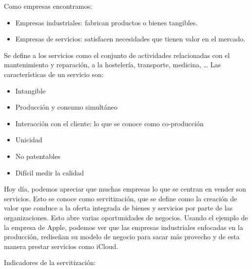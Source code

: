 \documentclass[12pt]{report} %
\providecommand{\tightlist}{%
  \setlength{\itemsep}{0pt}\setlength{\parskip}{0pt}}
\begin{document}
Como empresas encontramos:

\begin{itemize}
\tightlist
\item
  Empresas industriales: fabrican productos o bienes tangibles.\\
\item
  Empresas de servicios: satisfacen necesidades que tienen valor en el
  mercado.
\end{itemize}

Se define a los servicios como el conjunto de actividades relacionadas
con el mantenimiento y reparación, a la hostelería, transporte,
medicina, \ldots{} Las características de un servicio son:

\begin{itemize}
\tightlist
\item
  Intangible\\
\item
  Producción y consumo simultáneo\\
\item
  Interacción con el cliente: lo que se conoce como co-producción\\
\item
  Unicidad\\
\item
  No patentables\\
\item
  Difícil medir la calidad
\end{itemize}

Hoy día, podemos apreciar que muchas empresas lo que se centran en
vender son servicios. Esto se conoce como servitización, que se define
como la creación de valor que conduce a la oferta integrada de bienes y
servicios por parte de las organizaciones. Esto abre varias
oportunidades de negocios. Usando el ejemplo de la empresa de Apple,
podemos ver que las empresas industriales enfocadas en la producción,
rediseñan su modelo de negocio para sacar más provecho y de esta manera
prestar servicios como iCloud.

Indicadores de la servitización:
\end{document}
